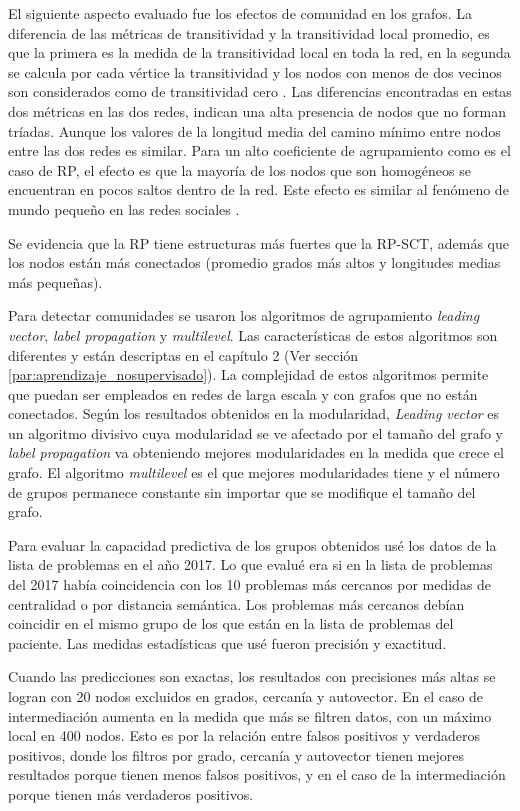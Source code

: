 El siguiente aspecto evaluado fue los efectos de comunidad en los grafos. La diferencia de las métricas de transitividad y la transitividad local promedio, es que la primera es la medida de la transitividad local en toda la red, en la segunda se calcula por cada vértice la transitividad y los nodos con menos de dos vecinos son considerados como de transitividad cero \cite{Watts1998}. Las diferencias encontradas en  estas dos métricas en las dos redes, indican una alta presencia de nodos que no forman tríadas. Aunque los valores de la longitud media del camino mínimo entre nodos entre las dos redes es similar. Para un alto coeficiente de agrupamiento como es el caso de \acrshort{RP}, el efecto es que la mayoría de los nodos que son homogéneos se encuentran en pocos saltos dentro de la red. Este efecto es similar al fenómeno de mundo pequeño en las redes sociales \cite{Cook2006}. 

Se evidencia que la \acrshort{RP} tiene estructuras más fuertes que la \acrshort{RP-SCT}, además que los nodos están más conectados (promedio grados más altos y longitudes medias más pequeñas). 

Para detectar comunidades se usaron los  algoritmos de agrupamiento \textit{leading vector}, \textit{label propagation} y \textit{multilevel}. Las características de estos algoritmos son diferentes y están descriptas en el capítulo 2 (Ver sección \ref{par:aprendizaje_nosupervisado}). La complejidad de estos algoritmos permite que puedan ser empleados en redes de larga escala y con grafos que no están conectados. Según los resultados obtenidos en la modularidad, \textit{Leading vector} es un algoritmo divisivo cuya modularidad se ve afectado por el tamaño del grafo y \textit{label propagation} va obteniendo mejores modularidades en la medida que crece el grafo. El algoritmo \textit{multilevel} es el que mejores modularidades tiene y el número de grupos permanece constante sin importar que se modifique el tamaño del grafo.

Para evaluar la capacidad predictiva de los grupos obtenidos usé los datos de la lista de problemas en el año 2017. Lo que evalué era si en la lista de problemas del 2017 había coincidencia con los 10  problemas más cercanos por medidas de centralidad o por distancia semántica. Los problemas más cercanos debían coincidir en el mismo grupo de los que están en la lista de problemas del paciente. Las medidas estadísticas que usé fueron precisión y exactitud. 

Cuando las predicciones son exactas, los resultados con precisiones más altas se logran con 20 nodos excluidos en grados, cercanía y autovector. En el caso de intermediación aumenta en la medida que más se filtren datos, con un máximo local en 400 nodos. Esto es por la relación entre falsos positivos y verdaderos positivos,  donde los filtros por grado, cercanía y autovector tienen mejores resultados porque tienen menos falsos positivos, y en el caso de la intermediación porque tienen más verdaderos positivos. 

